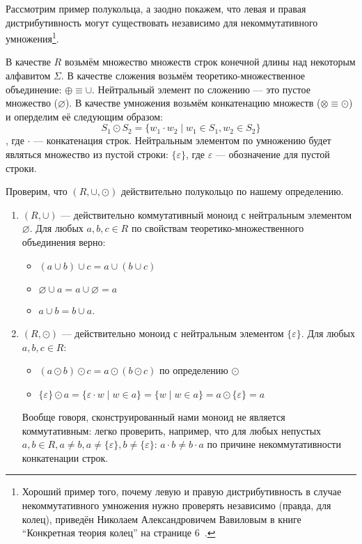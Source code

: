 \begin{example}\label{exmpl:semiring}
Рассмотрим пример полукольца, а заодно покажем, что левая и правая дистрибутивность могут существовать независимо для некоммутативного умножения\footnote{Хороший пример того, почему левую и правую дистрибутивность в случае некоммутативного умножения нужно проверять независимо (правда, для колец), приведён Николаем Александровичем Вавиловым в книге ``Конкретная теория колец'' на странице 6~\cite{VavilovRings}.}.

В качестве $R$ возьмём множество множеств строк конечной длины над некоторым алфавитом $\Sigma$. В качестве сложения возьмём теоретико-множественное объединение: $\oplus  \equiv \cup$. Нейтральный элемент по сложению --- это пустое множество ($\varnothing$).
В качестве умножения возьмём конкатенацию множеств ($\otimes  \equiv \odot$) и оперделим её следующим образом:
$$ S_1 \odot S_2 = \{ w_1 \cdot w_2 \mid w_1 \in S_1, w_2 \in S_2\}$$, где $\cdot$ --- конкатенация строк. Нейтральным элементом по умножению будет являться множество из пустой строки: $\{\varepsilon\}$, где $\varepsilon$ --- обозначение для пустой строки.

Проверим, что $(R, \cup, \odot)$ действительно полукольцо по нашему определению.

\begin{enumerate}

\item $(R, \cup)$ --- действительно коммутативный моноид с нейтральным элементом $\varnothing$. Для любых $a,b,c \in R$ по свойствам теоретико-множественного объединения верно:
\begin{itemize}
	\item $(a \cup b) \cup c = a \cup (b \cup c)$
	\item $\varnothing \cup a = a \cup \varnothing = a$
	\item $a \cup b = b \cup a$.
\end{itemize}

\item $(R, \odot)$ --- действительно моноид с нейтральным элементом $\{\varepsilon\}$. Для любых $a,b,c \in R$:
\begin{itemize}
	\item $(a \odot b) \odot c = a \odot (b \odot c)$ по определению $\odot$
    \item $\{\varepsilon\} \odot a = \{\varepsilon \cdot w \mid w \in a \} = \{w \mid w \in a \} = a \odot \{\varepsilon\} = a$
\end{itemize}
Вообще говоря, сконструированный нами моноид не является коммутативным: легко проверить, например, что для любых непустых $a,b \in R, a \neq b, a \neq \{\varepsilon\}, b \neq \{\varepsilon\}$: $a \cdot b \neq b \cdot a$ по причине некоммутативности конкатенации строк.


\end{enumerate}
\end{example}
